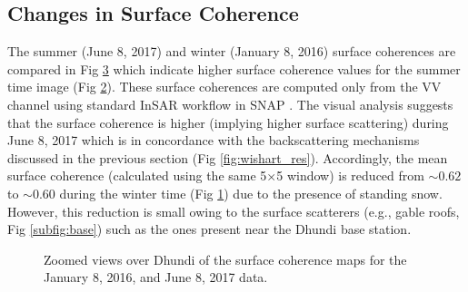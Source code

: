 \documentclass[12pt]{elsarticle}
\numberwithin{equation}{section}
\numberwithin{figure}{section}
\numberwithin{table}{section}
\begin{document}
\subsection{Changes in Surface Coherence}
The summer (June 8, 2017) and winter (January 8, 2016) surface coherences are compared in Fig \ref{fig:coh_res} which indicate higher surface coherence values for the summer time image (Fig \ref{subfig:coh_jun}). These surface coherences are computed only from the VV channel using standard InSAR workflow in SNAP \citep{ESA2019}. The visual analysis suggests that the surface coherence is higher (implying higher surface scattering) during June 8, 2017 which is in concordance with the backscattering mechanisms discussed in the previous section (Fig \ref{fig:wishart_res}). Accordingly, the mean surface coherence (calculated using the same 5$\times$5 window) is reduced from $\sim0.62$ to $\sim0.60$ during the winter time (Fig \ref{subfig:coh_jan}) due to the presence of standing snow. However, this reduction is small owing to the surface scatterers (e.g., gable roofs, Fig \ref{subfig:base}) such as the ones present near the Dhundi base station. 

\begin{figure}[!ht]
    \centering
    \begin{subfigure}[t]{\textwidth}
        \caption{}
        \label{subfig:coh_jan}
    \end{subfigure}
    \begin{subfigure}[t]{\textwidth}
        \caption{}
        \label{subfig:coh_jun}
    \end{subfigure}
    \caption{\doublespacing Zoomed views over Dhundi of the surface coherence maps for the  January 8, 2016, and  June 8, 2017 data.}
    \label{fig:coh_res}
\end{figure}
\FloatBarrier
\end{document}
